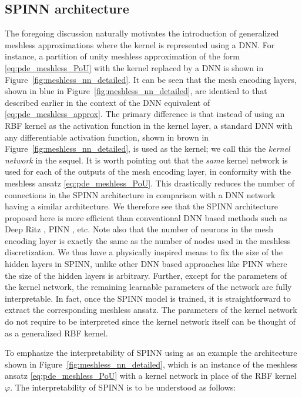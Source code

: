 \documentclass[12pt]{article}
\begin{document}
\subsection{SPINN architecture}
The foregoing discussion naturally motivates the introduction of generalized meshless approximations where the kernel is represented using a DNN. For instance, a partition of unity meshless approximation of the form \eqref{eq:pde_meshless_PoU} with the kernel replaced by a DNN is shown in Figure~\ref{fig:meshless_nn_detailed}. It can be seen that the mesh encoding layers, shown in blue in Figure~\ref{fig:meshless_nn_detailed}, are identical to that described earlier in the context of the DNN equivalent of \eqref{eq:pde_meshless_approx}. The primary difference is that instead of using an RBF kernel as the activation function in the kernel layer, a standard DNN with any differentiable activation function, shown in brown in Figure~\ref{fig:meshless_nn_detailed}, is used as the kernel; we call this the \emph{kernel network} in the sequel. It is worth pointing out that the \emph{same} kernel network is used for each of the outputs of the mesh encoding layer, in conformity with the meshless ansatz \eqref{eq:pde_meshless_PoU}. This drastically reduces the number of connections in the SPINN architecture in comparison with a DNN network having a similar architecture. We therefore see that the SPINN architecture proposed here is more efficient than conventional DNN based methods such as Deep Ritz \cite{EYu2018}, PINN \cite{RPK2019}, etc. Note also that the number of neurons in the mesh encoding layer is exactly the same as the number of nodes used in the meshless discretization. We thus have a physically inspired means to fix the size of the hidden layers in SPINN, unlike other DNN based approaches like PINN where the size of the hidden layers is arbitrary.  Further, except for the parameters of the kernel network, the remaining learnable parameters of the network are fully interpretable. In fact, once the SPINN model is trained, it is straightforward to extract the corresponding meshless ansatz. The parameters of the kernel network do not require to be interpreted since the kernel network itself can be thought of as a generalized RBF kernel.

To emphasize the interpretability of SPINN using as an example the architecture shown in Figure~\ref{fig:meshless_nn_detailed}, which is an instance of the meshless ansatz \eqref{eq:pde_meshless_PoU} with a kernel network in place of the RBF kernel $\varphi$. The interpretability of SPINN is to be understood as follows:
\end{document}
